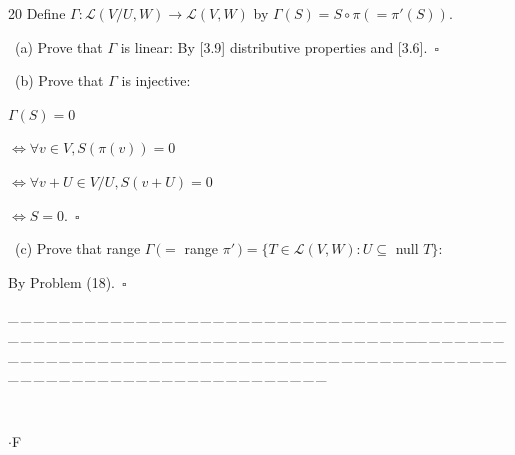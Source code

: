 \documentclass[a4paper, 11pt, UTF8]{article}
\def\Lm{\mathcal{L}}
\begin{document}
\begin{large}
{\timesbf\Large 20} {\timessl\Large Define $\Gamma:\Lm(V/U,W)\rightarrow\Lm(V,W)$ by $\Gamma(S)=S\circ\pi(=\pi'(S))$.}\par\quad\,
(a) {\timessl\Large Prove that $\Gamma$ is linear:} By [3.9] distributive properties and [3.6].\,\,\,$\square$\par\quad\,
(b) {\timessl\Large Prove that $\Gamma$ is injective:}\par\qquad\qquad\quad $\Gamma(S)=0$\par\qquad\quad
$\Longleftrightarrow\forall v\in V,S(\pi(v))=0$\par\qquad\quad
$\Longleftrightarrow\forall v+U\in V/U,S(v+U)=0$\par\qquad\quad
$\Longleftrightarrow S=0.\,\,\,\square$\par\quad\,
(c) {\timessl\Large Prove that range $\Gamma\,(=$ range $\pi'\,)=\{T\in\Lm(V,W):U\subseteq$ null $T\}$:}\par\qquad\quad By Problem (18).$\,\,\,\square$\par
{\tiny \_\,\_\,\_\,\_\,\_\,\_\,\_\,\_\,\_\,\_\,\_\,\_\,\_\,\_\,\_\,\_\,\_\,\_\,\_\,\_\,\_\,\_\,\_\,\_\,\_\,\_\,\_\,\_\,\_\,\_\,\_\,\_\,\_\,\_\,\_\,\_\,\_\,\_\,\_\,\_\,\_\,\_\,\_\,\_\,\_\,\_\,\_\,\_\,\_\,\_\,\_\,\_\,\_\,\_\,\_\,\_\,\_\,\_\,\_\,\_\,\_\,\_\,\_\,\_\,\_\,\_\,\_\,\_\,\_\,\_\,\_\_\,\_\,\_\,\_\,\_\,\_\,\_\,\_\,\_\,\_\,\_\,\_\,\_\,\_\,\_\,\_\,\_\,\_\,\_\,\_\,\_\,\_\,\_\,\_\,\_\,\_\,\_\,\_\,\_\,\_\,\_\,\_\,\_\,\_\,\_\,\_\,\_\,\_\,\_\,\_\,\_\,\_\,\_\,\_\,\_\,\_\,\_\,\_\,\_\,\_\,\_\,\_\,\_\,\_\,\_\,\_\,\_\,\_\,\_\,\_\,\_\,\_\,\_\,\_\,\_\,\_\,\_\,\_\,\_\,\_\,\_}{\tiny\,\par}
\par
{\huge{}$\cdot$F}\par


\end{large}
\end{document}
